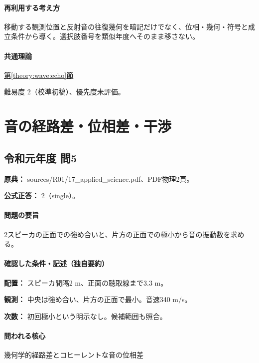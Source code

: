 \paragraph{再利用する考え方} 移動する観測位置と反射音の往復幾何を暗記だけでなく、位相・幾何・符号と成立条件から導く。選択肢番号を類似年度へそのまま移さない。

\paragraph{共通理論} \hyperref[theory:wave:echo]{第\ref*{theory:wave:echo}節}

\par 難易度 2（校準初稿）、優先度未評価。

\section{音の経路差・位相差・干渉}

\subsection{令和元年度 問5}
\label{q:r01-reg-applied-05}

\noindent\textbf{原典：} sources/R01/17\_applied\_science.pdf、PDF物理2頁。

\textbf{公式正答：} 2（single）。

\paragraph{問題の要旨} 2スピーカの正面での強め合いと、片方の正面での極小から音の振動数を求める。

\paragraph{確認した条件・記述（独自要約）}\mbox{}\par

\noindent\textbf{配置：} スピーカ間隔2 m、正面の聴取線まで3.3 m。\par

\noindent\textbf{観測：} 中央は強め合い、片方の正面で最小。音速340 m/s。\par

\noindent\textbf{次数：} 初回極小という明示なし。候補範囲も照合。\par

\paragraph{問われる核心} 幾何学的経路差とコヒーレントな音の位相差

